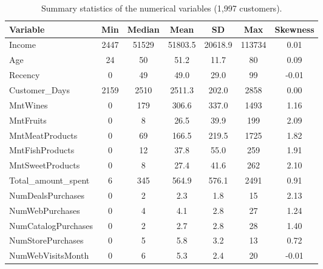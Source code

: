 \documentclass[11pt,a4paper]{article}
\begin{document}
\begin{table}[H]
	\centering
	\small
	\begin{tabular}{l S[table-format=4.0] S[table-format=5.0] S[table-format=5.1] S[table-format=5.1] S[table-format=6.0] S[table-format=-1.2]}
		\toprule
		Variable             & {Min} & {Median} & {Mean}  & {SD}    & {Max}  & {Skewness} \\
		\midrule
		Income               & 2447  & 51529    & 51803.5 & 20618.9 & 113734 & 0.01       \\
		Age                  & 24    & 50       & 51.2    & 11.7    & 80     & 0.09       \\
		Recency              & 0     & 49       & 49.0    & 29.0    & 99     & -0.01      \\
		Customer\_Days       & 2159  & 2510     & 2511.3  & 202.0   & 2858   & 0.00       \\
		MntWines             & 0     & 179      & 306.6   & 337.0   & 1493   & 1.16       \\
		MntFruits            & 0     & 8        & 26.5    & 39.9    & 199    & 2.09       \\
		MntMeatProducts      & 0     & 69       & 166.5   & 219.5   & 1725   & 1.82       \\
		MntFishProducts      & 0     & 12       & 37.8    & 55.0    & 259    & 1.91       \\
		MntSweetProducts     & 0     & 8        & 27.4    & 41.6    & 262    & 2.10       \\
		Total\_amount\_spent & 6     & 345      & 564.9   & 576.1   & 2491   & 0.91       \\
		NumDealsPurchases    & 0     & 2        & 2.3     & 1.8     & 15     & 2.13       \\
		NumWebPurchases      & 0     & 4        & 4.1     & 2.8     & 27     & 1.24       \\
		NumCatalogPurchases  & 0     & 2        & 2.7     & 2.8     & 28     & 1.40       \\
		NumStorePurchases    & 0     & 5        & 5.8     & 3.2     & 13     & 0.72       \\
		NumWebVisitsMonth    & 0     & 6        & 5.3     & 2.4     & 20     & -0.01      \\
		\bottomrule
	\end{tabular}
	\caption{Summary statistics of the numerical variables (1,997 customers).}
	\label{tab:desc}
\end{table}
\end{document}
